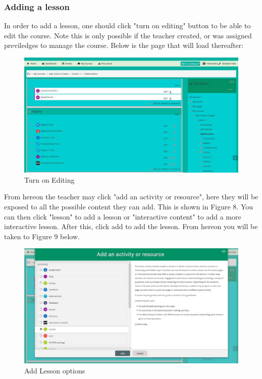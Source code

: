 \documentclass[12pt,a4paper]{article}
\begin{document}
			\subsubsection{Adding a lesson}
				In order to add a lesson, one should click "turn on editing" button to be able to edit the course. Note this is only possible if the teacher created, or was assigned previledges to manage the course. Below is the page that will load thereafter:
			 
				\begin{figure}[h]
				 	\centering
				 	\includegraphics[width=1\textwidth]{images/editCourse.JPG}
				 	\caption{Turn on Editing}
				 	\label{Figure 7}
				 \end{figure}
		 		From hereon the teacher may click "add an activity or resource", here they will be exposed to all the possible content they can add. This is shown in Figure 8. You can then click "lesson" to add a lesson or "interactive content" to add a more interactive lesson. After this, click add to add the lesson. From hereon you will be taken to Figure 9 below.
		 	
		 		\begin{figure}[h]
		 			\centering
		 			\includegraphics[width=1\textwidth]{images/addLesson.JPG}
		 			\caption{Add Lesson options}
		 			\label{Figure 8}
		 		\end{figure}
			 
\end{document}
